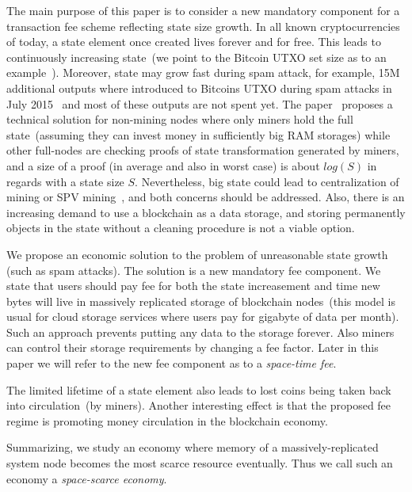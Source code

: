 \documentclass[]{llncs}   %
\newcommand{\authnote}[2]{\marginpar{\parbox{\marginparwidth}{\tiny %
  \textsf{#1 {\textcolor{blue}{notes: #2}}}}}%
  \textcolor{blue}{\textbf{\dag}}}
\newcommand{\authnote}[2]{
  \textsf{#1 \textcolor{blue}{: #2}}}
\newcommand{\authnote}[2]{}
\newcommand{\knote}[1]{{\authnote{\textcolor{green}{Alex notes}}{#1}}}
\newcommand{\dnote}[1]{{\authnote{\textcolor{blue}{Dima notes}}{#1}}}
\begin{document}
The main purpose of this paper is to consider a new mandatory component for a transaction fee scheme reflecting state size growth. In all known cryptocurrencies of today, a state element once created lives forever and for free. This leads to continuously increasing state~(we point to the Bitcoin UTXO set size as to an example~\cite{utxoChart}). Moreover, state may grow fast during spam attack, for example, 15M additional outputs where introduced to Bitcoins UTXO during spam attacks in July 2015~\cite{bitcoin2015flood} and most of these outputs are not spent yet. The paper~\cite{reyzin2016improving}\dnote{was it assumed?} proposes a technical solution for non-mining nodes where only miners hold the full state~(assuming they can invest money in sufficiently big RAM storages) while other full-nodes are checking proofs of state transformation generated by miners, and a size of a proof (in average and also in worst case) is about $log(S)$ in regards with a state size $S$. Nevertheless, big state could lead to centralization of mining or SPV mining~\cite{spvMining}, and both concerns should be addressed.
Also, there is an increasing demand to use a blockchain as a data storage, and storing permanently objects in the state without a cleaning procedure is not a viable option.

We propose an economic solution to the problem of unreasonable state growth (such as spam attacks). The solution is a new mandatory fee component. We state that users should pay fee for both the state increasement and time new bytes will live in massively replicated storage of blockchain nodes~(this model is usual for cloud storage services where users pay for gigabyte of data per month). Such an approach prevents putting any data to the storage forever. Also miners can control their storage requirements by changing a fee factor. Later in this paper we will refer to the new fee component as to a \textit{space-time fee}.

The limited lifetime of a state element also leads to lost coins being taken back into circulation~(by miners). Another interesting effect is that the proposed fee regime is promoting money circulation in the blockchain economy.

Summarizing, we study an economy where memory of a massively-replicated system node becomes the most scarce resource eventually. Thus we call such an economy a \textit{space-scarce economy}.  

\knote{note that we're talking about minimal fees}
\end{document}
